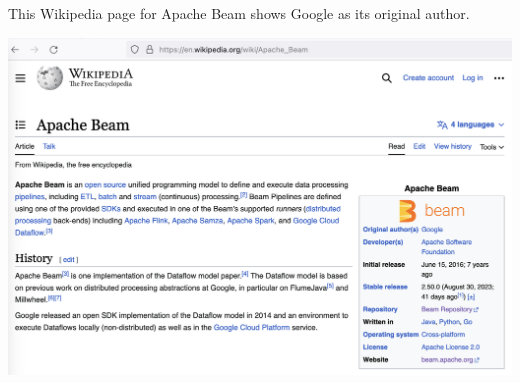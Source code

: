 
This Wikipedia page for Apache Beam shows Google as its original author.

\includegraphics[width=\textwidth]{beam-wikipedia}

\pagebreak
